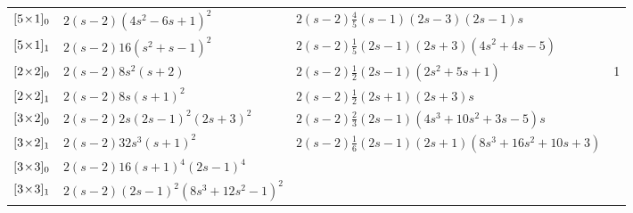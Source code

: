 \begin{table}
\begin{center}
{\begin{tabular}{lllr}
${[5\!\times\!1]_{0}}$    & $2({s}-2)\left(4{s}^2-6{s}+1\right)^2$ & $2({s}-2)\frac{4}{5}({s}-1)(2{s}-3)(2{s}-1)s$
                                  & \\
${[5\!\times\!1]_{1}}$  & $2({s}-2)16\left({s}^2+{s}-1\right)^2$ & $2({s}-2)\frac{1}{5}(2{s}-1)(2{s}+3)(4{s}^2+4{s}-5)$
                                  & \\
${[2\!\times\!2]_{0}}$    & $2({s}-2)8s^2({s}+2)$ & $2({s}-2)\frac{1}{2}(2{s}-1)(2{s}^2+5{s}+1)$  & 1 \\
${[2\!\times\!2]_{1}}$  & $2(s-2)8s (s+1)^2$ & $2({s}-2)\frac{1}{2}(2{s}+1)(2{s}+3)s$ &  \\
${[3\!\times\!2]_{0}}$    & $2({s}-2)2s(2{s}-1)^2 (2{s}+3)^2$
	& $2({s}-2)\frac{2}{3}(2{s}-1)(4{s}^3+10{s}^2+3{s}-5)s$
                                  &  \\
${[3\!\times\!2]_{1}}$  & $2({s}-2)32{s}^3({s}+1)^2$
	& $2 ({s}-2) \frac{1}{6} (2 {s}-1) (2 {s}+1) (8 {s}^3+16 {s}^2+10 {s}+3)$
                                  &  \\
${[3\!\times\!3]_{0}}$    & $2({s}-2)16({s}+1)^4(2{s}-1)^4$
                                  &  \\
${[3\!\times\!3]_{1}}$  & $2({s}-2)(2{s}-1)^2(8{s}^3+12{s}^2-1)^2$
	            &  \\
\end{tabular}
} %
\end{center}
\end{table}
